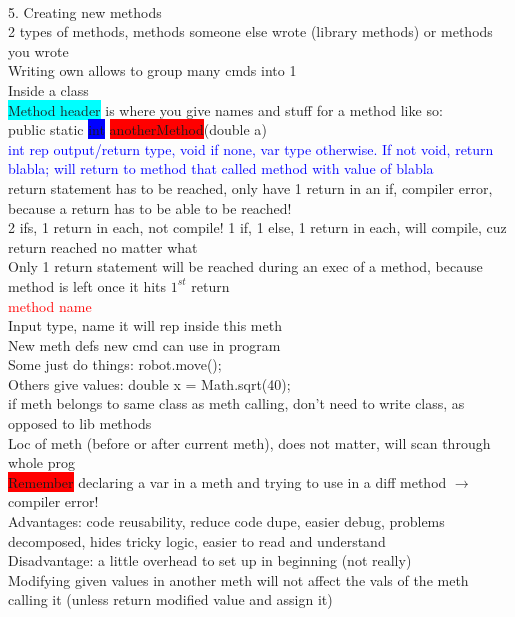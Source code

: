 ~\\\color{Orange}
5. Creating new methods
\\ 2 types of methods, methods someone else wrote (library methods) or methods you wrote
\\ Writing own allows to group many cmds into 1
\\Inside a class
\\ \colorbox{Cyan}{Method header} is where you give names and stuff for a method like so:
\\ public static \colorbox{Blue}{int} \colorbox{Red}{anotherMethod}(\colorbox{OliveGreen}{double a})
\\ \textcolor{Blue}{int rep output/return type, void if none, var type otherwise. If not void, return blabla; will return to method that called method with value of blabla}
\\ return statement has to be reached, only have 1 return in an if, compiler error, because a return has to be able to be reached!
\\ 2 ifs, 1 return in each, not compile! 1 if, 1 else, 1 return in each, will compile, cuz return reached no matter what
\\ Only 1 return statement will be reached during an exec of a method, because method is left once it hits $1^{st}$ return
\\ \textcolor{Red}{method name}
\\ \textcolor{OliveGreen}{Input type, name it will rep inside this meth}
\\ New meth defs new cmd can use in program
\\ Some just do things: robot.move();
\\ Others give values: double x = Math.sqrt(40);
\\ if meth belongs to same class as meth calling, don't need to write class, as opposed to lib methods
\\ Loc of meth (before or after current meth), does not matter, will scan through whole prog
\\ \colorbox{Red}{Remember} declaring a var in a meth and trying to use in a diff method $\rightarrow$ compiler error!
\\ Advantages: code reusability, reduce code dupe, easier debug, problems decomposed, hides tricky logic, easier to read and understand
\\ Disadvantage: a little overhead to set up in beginning (not really)
\\ Modifying given values in another meth will not affect the vals of the meth calling it (unless return modified value and assign it)